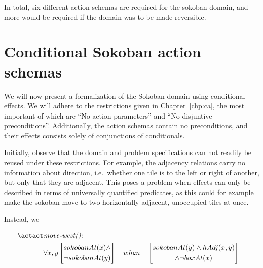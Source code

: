 \documentclass[../Master.tex]{subfiles}
\begin{document}
In total, six different action schemas are required for the sokoban domain, and more would be required if the domain was to be made reversible.

\section{Conditional Sokoban action schemas}

We will now present a formalization of the Sokoban domain using conditional effects. We will adhere to the restrictions given in Chapter~\ref{chp:ca}, the most important of which are ``No action parameters'' and ``No disjuntive preconditions''. Additionally, the action schemas contain no preconditions, and their effects consists solely of conjunctions of conditionals.

Initially, observe that the domain and problem specifications can not readily be reused under these restrictions. For example, the adjacency relations carry no information about direction, i.e.\ whether one tile is to the left or right of another, but only that they are adjacent. This poses a problem when effects can only be described in terms of universally quantified predicates, as this could for example make the sokoban move to two horizontally adjacent, unoccupied tiles at once.

Instead, we

\begin{align*}
\actact & \textit{move-west(): } &  \\
& \forall x, y
    \left[
        \begin{gathered}
            sokobanAt(x) \land 
            \\ \neg sokobanAt(y) 
        \end{gathered}
    \right]
    \quad when \quad
    \left[ 
        \begin{gathered}
            sokobanAt(y) \land hAdj(x,y) \\ 
            \land \neg boxAt(x)
        \end{gathered}
    \right]
\end{align*}
\end{document}
